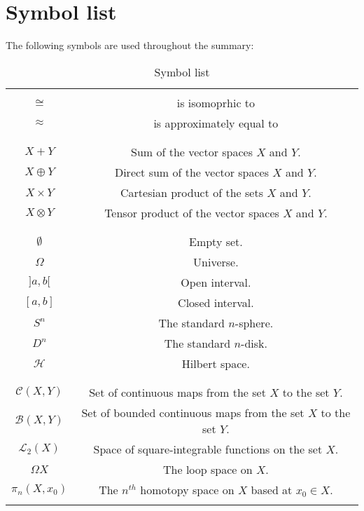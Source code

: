 \chapter{Symbol list}

The following symbols are used throughout the summary:

\begin{table}[h]
	\centering
	\begin{tabular}{|c|c|}
		\hline&\\
		$\cong$&is isomoprhic to\\
		$\approx$&is approximately equal to\\&\\
		\hline&\\
		$X+Y$&Sum of the vector spaces $X$ and $Y$.\\
		$X\oplus Y$&Direct sum of the vector spaces $X$ and $Y$.\\
		$X\times Y$&Cartesian product of the sets $X$ and $Y$.\\
		$X\otimes Y$&Tensor product of the vector spaces $X$ and $Y$.\\&\\
		\hline&\\
		$\emptyset$&Empty set.\\
		$\Omega$&Universe.\\
		$]a, b[$&Open interval.\\
		$[a, b]$&Closed interval.\\
		$S^n$&The standard $n$-sphere.\\
		$D^n$&The standard $n$-disk.\\
		$\mathcal{H}$&Hilbert space.\\&\\
		\hline&\\
		$\mathcal{C}(X, Y)$&Set of continuous maps from the set $X$ to the set $Y$.\\
		$\mathcal{B}(X, Y)$&Set of bounded continuous maps from the set $X$ to the set $Y$.\\
		$\mathcal{L}_2(X)$&Space of square-integrable functions on the set $X$.\\
		$\Omega X$&The loop space on $X$.\\
		$\pi_n(X, x_0)$&The $n^{th}$ homotopy space on $X$ based at $x_0\in X$.\\&\\
		\hline
	\end{tabular}
	\caption{Symbol list}
	\label{symbols}
\end{table}
